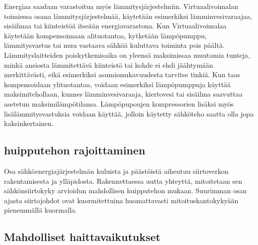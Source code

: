   Energiaa saadaan varastoitua myös lämmitysjärjestelmiin. Virtuaalivoimalan toimiessa osana lämmitysjärjestelmää, käytetään esimerkiksi lämminvesivaraajaa, sisäilmaa tai kiinteistöä itseään energiavarastona. Kun Virtuaalivoimalaa käytetään kompensoimaan alituotantoa, kytketään lämpöpumppu, lämmitysvastus tai muu vastaava sähköä kuluttava toiminta pois päältä. Lämmityslaitteiden poiskytkemisaika on yleensä maksimissaa muutamia tunteja, minkä ansiosta lämmitettävä kiinteistö tai kohde ei ehdi jäähtymään merkittävästi, eikä esimerkiksi asumismukavuudesta tarvitse tinkiä. Kun taas kompensoidaan ylituotantoa, voidaan esimerkiksi lämpöpumppuja käyttää maksimitehollaan, kunnes lämminvesivaraaja, kiertovesi tai sisäilma saavuttaa asetetun maksimilämpötilansa. Lämpöpupoujen kompressorien lisäksi myös lisälämmitysvastuksia voidaan käyttää, jolloin käytetty sähköteho saatta olla jopa kaksinkertainen.

\subsection{huipputehon rajoittaminen}

  Osa sähköenergiajärjestelmän kuluista ja päästöistä aiheutuu siirtoverkon rakentamisesta ja ylläpidosta. Rakennettaessa uutta yhteyttä, mitoitetaan sen sähkönsiirtokyky arvioidun mahdollisen huipputehon mukaan. Suurimman osan ajasta siirtojohdot ovat kuormitettuina huomattavasti mitoituskantokykyään pienemmällä kuormalla. 

\subsection{Mahdolliset haittavaikutukset}
